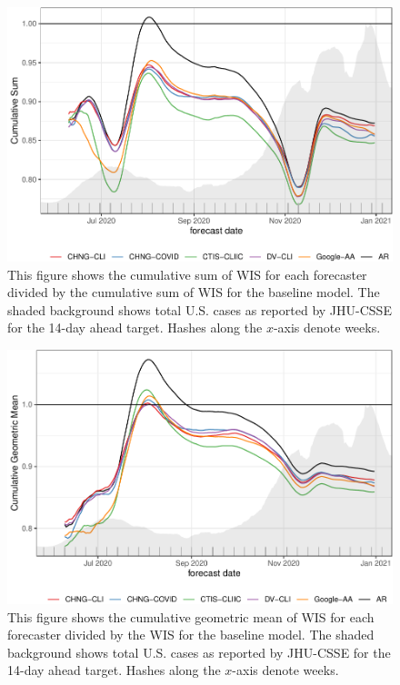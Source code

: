 \documentclass[9pt,twoside,lineno]{pnas-new}
\begin{document}
\clearpage

\clearpage

\begin{figure}

{\centering \includegraphics[width=\textwidth]{fig/cumulative-mean-1} 

}

\caption{This figure shows the cumulative sum of WIS for each forecaster divided by the cumulative sum of WIS for the baseline model. The shaded background shows total U.S. cases as reported by JHU-CSSE for the 14-day ahead target. Hashes along the $x$-axis denote weeks.}\label{fig:cumulative-mean}
\end{figure}

\clearpage

\begin{figure}

{\centering \includegraphics[width=\textwidth]{fig/cumulative-geo-mean-1} 

}

\caption{This figure shows the cumulative geometric mean of WIS for each forecaster divided by the WIS for the baseline model. The shaded background shows total U.S. cases as reported by JHU-CSSE for the 14-day ahead target. Hashes along the $x$-axis denote weeks.}\label{fig:cumulative-geo-mean}
\end{figure}
\end{document}
